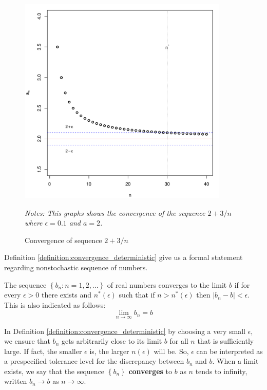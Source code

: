 \documentclass[english,12pt]{book}\usepackage[]{graphicx}\usepackage[]{xcolor}
\newenvironment{knitrout}{}{} %
\begin{document}
\begin{figure}[ht]
  \caption{Convergence of sequence $2 + 3/n$}
    \label{fig:SeqConv}
    \centering
    \begin{minipage}{.9\linewidth}
\begin{knitrout}
\color{fgcolor}

{\centering \includegraphics[width=10cm,height=10cm]{figure/SeqConv-1} 

}


\end{knitrout}
\footnotesize
		\emph{Notes: This graphs shows the convergence of the sequence $2 + 3/n$ where $\epsilon = 0.1$ and $a = 2$.}
	\end{minipage}
\end{figure}


Definition \ref{definition:convergence_deterministic} give us a formal statement regarding nonstochastic sequence of numbers.

\begin{definition}\label{definition:convergence_deterministic}
	The sequence $\left\lbrace b_n: n = 1,2,... \right\rbrace$ of real numbers  converges to the limit $b$ if for every $\epsilon > 0$ there exists and $n^*(\epsilon)$ such that if $n>n^*(\epsilon)$ then $|b_n - b|<\epsilon$. This is also indicated as follows:
\begin{equation*}
\lim_{n\to \infty} b_n = b
\end{equation*}	
\end{definition}

In Definition \ref{definition:convergence_deterministic} by choosing a very small $\epsilon$, we ensure that $b_n$ gets arbitrarily close to its limit $b$ for all $n$ that is sufficiently large. If fact, the smaller $\epsilon$ is, the larger $n(\epsilon)$ will be. So, $\epsilon$ can be interpreted as a prespecified tolerance level for the discrepancy between $b_n$ and $b$. When a limit exists, we say that the sequence $\left\lbrace b_n \right\rbrace$ \textbf{converges} to $b$ as $n$ tends to infinity, written $b_n\to b$ as $n\to \infty$.
\end{document}
